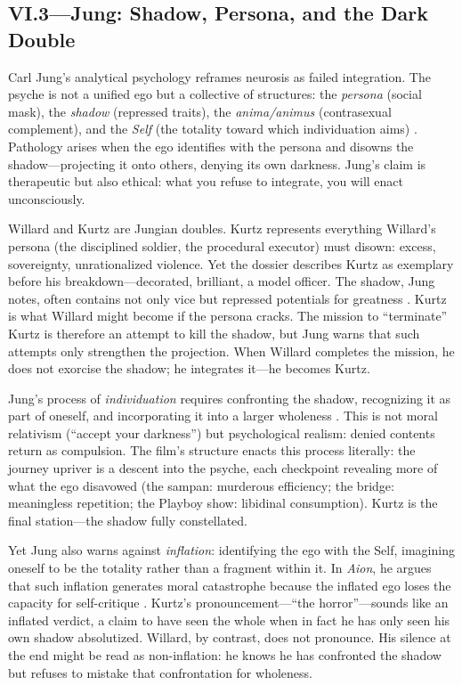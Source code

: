 \subsection*{VI.3—Jung: Shadow, Persona, and the Dark Double}
\label{ssec:vi-jung}

Carl Jung's analytical psychology reframes neurosis as failed integration. The psyche is not a
unified ego but a collective of structures: the \emph{persona} (social mask), the
\emph{shadow} (repressed traits), the \emph{anima/animus} (contrasexual complement), and the
\emph{Self} (the totality toward which individuation aims) \parencite{JungArchetypes1969}.
Pathology arises when the ego identifies with the persona and disowns the shadow---projecting
it onto others, denying its own darkness. Jung's claim is therapeutic but also ethical: what
you refuse to integrate, you will enact unconsciously.

Willard and Kurtz are Jungian doubles. Kurtz represents everything Willard's persona (the
disciplined soldier, the procedural executor) must disown: excess, sovereignty,
unrationalized violence. Yet the dossier describes Kurtz as exemplary before his
breakdown---decorated, brilliant, a model officer. The shadow, Jung notes, often contains not
only vice but repressed potentials for greatness \parencite{JungArchetypes1969}. Kurtz is what
Willard might become if the persona cracks. The mission to ``terminate'' Kurtz is therefore an
attempt to kill the shadow, but Jung warns that such attempts only strengthen the projection.
When Willard completes the mission, he does not exorcise the shadow; he integrates it---he
becomes Kurtz.

Jung's process of \emph{individuation} requires confronting the shadow, recognizing it as part
of oneself, and incorporating it into a larger wholeness \parencite{JungArchetypes1969}. This
is not moral relativism (``accept your darkness'') but psychological realism: denied contents
return as compulsion. The film's structure enacts this process literally: the journey upriver
is a descent into the psyche, each checkpoint revealing more of what the ego disavowed (the
sampan: murderous efficiency; the bridge: meaningless repetition; the Playboy show: libidinal
consumption). Kurtz is the final station---the shadow fully constellated.

Yet Jung also warns against \emph{inflation}: identifying the ego with the Self, imagining
oneself to be the totality rather than a fragment within it. In \textit{Aion}, he argues that
such inflation generates moral catastrophe because the inflated ego loses the capacity for
self-critique \parencite{JungAion1969}. Kurtz's pronouncement---``the horror''---sounds like
an inflated verdict, a claim to have seen the whole when in fact he has only seen his own
shadow absolutized. Willard, by contrast, does not pronounce. His silence at the end might be
read as non-inflation: he knows he has confronted the shadow but refuses to mistake that
confrontation for wholeness.

